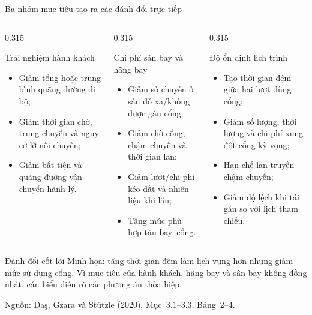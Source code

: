 \documentclass[aspectratio=169,10pt]{beamer}
\begin{document}
\begin{frame}[t]{Ba nhóm mục tiêu tạo ra các đánh đổi trực tiếp}

\footnotesize
\begin{columns}[T,onlytextwidth]
\begin{column}{0.315\textwidth}
\begin{block}{Trải nghiệm hành khách}
\begin{itemize}
    \setlength{\itemsep}{1pt}
    \item Giảm tổng hoặc trung bình quãng đường đi bộ;
    \item Giảm thời gian chờ, trung chuyển và nguy cơ lỡ nối chuyến;
    \item Giảm bất tiện và quãng đường vận chuyển hành lý.
\end{itemize}
\end{block}
\end{column}

\begin{column}{0.315\textwidth}
\begin{alertblock}{Chi phí sân bay và hãng bay}
\begin{itemize}
    \setlength{\itemsep}{1pt}
    \item Giảm số chuyến ở sân đỗ xa/không được gán cổng;
    \item Giảm chờ cổng, chậm chuyến và thời gian lăn;
    \item Giảm lượt/chi phí kéo dắt và nhiên liệu khi lăn;
    \item Tăng mức phù hợp tàu bay--cổng.
\end{itemize}
\end{alertblock}
\end{column}

\begin{column}{0.315\textwidth}
\begin{exampleblock}{Độ ổn định lịch trình}
\begin{itemize}
    \setlength{\itemsep}{1pt}
    \item Tạo thời gian đệm giữa hai lượt dùng cổng;
    \item Giảm số lượng, thời lượng và chi phí xung đột cổng kỳ vọng;
    \item Hạn chế lan truyền chậm chuyến;
    \item Giảm độ lệch khi tái gán so với lịch tham chiếu.
\end{itemize}
\end{exampleblock}
\end{column}
\end{columns}

\vspace{-0.6ex}
\begin{block}{Đánh đổi cốt lõi}
Minh họa: tăng thời gian đệm làm lịch vững hơn nhưng giảm mức sử dụng cổng.
Vì mục tiêu của hành khách, hãng bay và sân bay không đồng nhất, cần biểu diễn rõ các phương án thỏa hiệp.
\end{block}

\vfill
\tiny Nguồn: Da\c{s}, Gzara và St\"utzle (2020), Mục~3.1--3.3, Bảng~2--4.
\end{frame}
\end{document}
